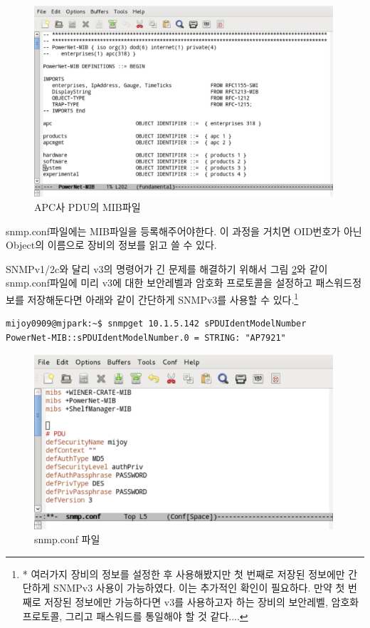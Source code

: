 \documentclass[11pt
  , a4paper
  , article
  , oneside
]{memoir}
\begin{document}
\begin{figure}[h]
  \centering
  \includegraphics[width=0.99\textwidth]{./images/pdu_mib.eps}
  \caption{APC사 PDU의 MIB파일}
  \label{fig:pdu_mib}   
\end{figure}


\clearpage

snmp.conf파일에는 MIB파일을 등록해주어야한다. 이 과정을 거치면 OID번호가 아닌 Object의 이름으로 장비의 정보를 읽고 쓸 수 있다. 

SNMPv1/2c와 달리 v3의 명령어가 긴 문제를 해결하기 위해서 그림 \ref{fig:snmp_conf}와 같이 snmp.conf파일에 미리 v3에 대한 보안레벨과 암호화 프로토콜을 설정하고 패스워드정보를 저장해둔다면 아래와 같이 간단하게 SNMPv3를 사용할 수 있다.\footnote{* 여러가지 장비의 정보를 설정한 후 사용해봤지만 첫 번째로 저장된 정보에만 간단하게 SNMPv3 사용이 가능하였다. 이는 추가적인 확인이 필요하다. 만약 첫 번째로 저장된 정보에만 가능하다면 v3를 사용하고자 하는 장비의 보안레벨, 암호화 프로토콜, 그리고 패스워드를 통일해야 할 것 같다....}

\begin{lstlisting}[style=termstyle]
mijoy0909@mjpark:~$ snmpget 10.1.5.142 sPDUIdentModelNumber
PowerNet-MIB::sPDUIdentModelNumber.0 = STRING: "AP7921"
\end{lstlisting}


\begin{figure}[h]
  \centering
  \includegraphics[width=0.99\textwidth]{./images/snmp_conf.eps}
  \caption{snmp.conf 파일}
  \label{fig:snmp_conf}   
\end{figure}
\end{document}
